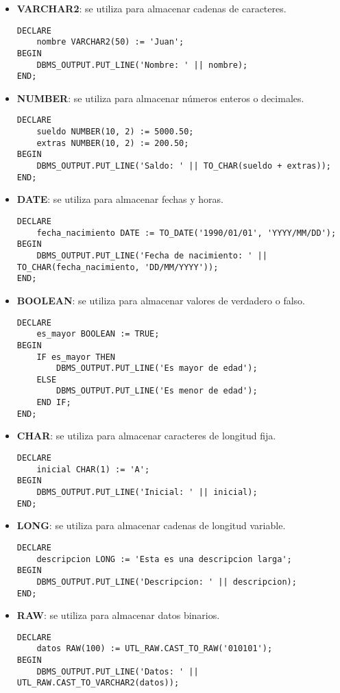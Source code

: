 \documentclass[executivepaper]{article}
\begin{document}
\begin{itemize}
    \item \textbf{VARCHAR2}: se utiliza para almacenar cadenas de caracteres.
\begin{lstlisting}
DECLARE
    nombre VARCHAR2(50) := 'Juan';
BEGIN
    DBMS_OUTPUT.PUT_LINE('Nombre: ' || nombre);
END;    
\end{lstlisting}
    \item \textbf{NUMBER}: se utiliza para almacenar números enteros o decimales.
\begin{lstlisting}
DECLARE
    sueldo NUMBER(10, 2) := 5000.50;
    extras NUMBER(10, 2) := 200.50;
BEGIN
    DBMS_OUTPUT.PUT_LINE('Saldo: ' || TO_CHAR(sueldo + extras));
END;
\end{lstlisting}
    \item \textbf{DATE}: se utiliza para almacenar fechas y horas.
\begin{lstlisting}
DECLARE
    fecha_nacimiento DATE := TO_DATE('1990/01/01', 'YYYY/MM/DD');
BEGIN
    DBMS_OUTPUT.PUT_LINE('Fecha de nacimiento: ' || TO_CHAR(fecha_nacimiento, 'DD/MM/YYYY'));
END;
\end{lstlisting}
    \item \textbf{BOOLEAN}: se utiliza para almacenar valores de verdadero o falso.
\begin{lstlisting}
DECLARE
    es_mayor BOOLEAN := TRUE;
BEGIN
    IF es_mayor THEN
        DBMS_OUTPUT.PUT_LINE('Es mayor de edad');
    ELSE
        DBMS_OUTPUT.PUT_LINE('Es menor de edad');
    END IF;
END;
\end{lstlisting}
    \item \textbf{CHAR}: se utiliza para almacenar caracteres de longitud fija.
\begin{lstlisting}
DECLARE
    inicial CHAR(1) := 'A';
BEGIN
    DBMS_OUTPUT.PUT_LINE('Inicial: ' || inicial);
END;    
\end{lstlisting}
    \item \textbf{LONG}: se utiliza para almacenar cadenas de longitud variable.
\begin{lstlisting}
DECLARE
    descripcion LONG := 'Esta es una descripcion larga';
BEGIN
    DBMS_OUTPUT.PUT_LINE('Descripcion: ' || descripcion);
END;    
\end{lstlisting}
    \item \textbf{RAW}: se utiliza para almacenar datos binarios.
\begin{lstlisting}
DECLARE
    datos RAW(100) := UTL_RAW.CAST_TO_RAW('010101');
BEGIN
    DBMS_OUTPUT.PUT_LINE('Datos: ' || UTL_RAW.CAST_TO_VARCHAR2(datos));

\end{lstlisting}
\end{itemize}
\end{document}
